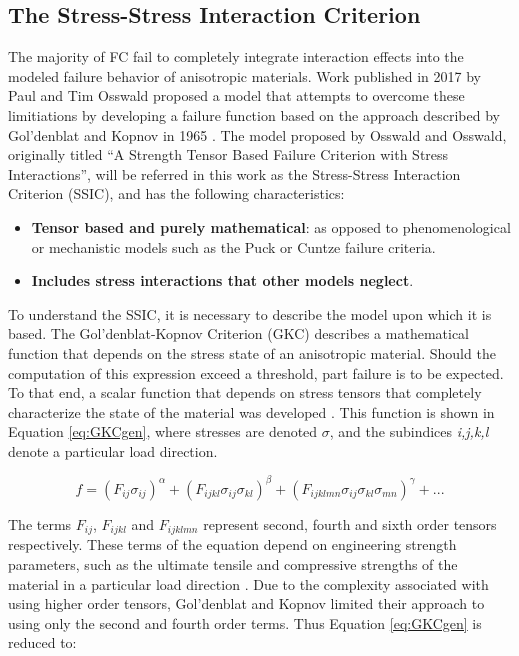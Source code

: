 \documentclass[main.tex]{subfiles}
\begin{document}
\subsection{The Stress-Stress Interaction Criterion}

The majority of FC fail to completely integrate interaction effects into the modeled failure behavior of anisotropic materials. Work published in 2017 by Paul and Tim Osswald \cite{Osswald2017a} proposed a model that attempts to overcome these limitiations by developing a failure function based on the approach described by Gol'denblat and Kopnov in 1965 \cite{Goldenblat1965}. The model proposed by Osswald and Osswald, originally titled \textquotedblleft A Strength Tensor Based Failure Criterion with Stress Interactions\textquotedblright, will be referred in this work as the Stress-Stress Interaction Criterion (SSIC), and has the following characteristics:

\begin{itemize}
	\item \textbf{Tensor based and purely mathematical}: as opposed to phenomenological or mechanistic models such as the Puck or Cuntze failure criteria.
	\item \textbf{Includes stress interactions that other models neglect}.
\end{itemize}

To understand the SSIC, it is necessary to describe the model upon which it is based. The Gol'denblat-Kopnov Criterion (GKC) describes a mathematical function that depends on the stress state of an anisotropic material. Should the computation of this expression exceed a threshold, part failure is to be expected. To that end, a scalar function that depends on stress tensors that completely characterize the state of the material was developed \cite{Goldenblat1965}. This function is shown in Equation \ref{eq:GKCgen}, where stresses are denoted $\sigma$, and the subindices \emph{i,j,k,l} denote a particular load direction.

\begin{equation} \label{eq:GKCgen}
f=(F_{ij}\sigma_{ij})^\alpha + (F_{ijkl}\sigma_{ij}\sigma_{kl})^\beta + (F_{ijklmn}\sigma_{ij}\sigma_{kl}\sigma_{mn})^\gamma + ...
\end{equation}

The terms $F_{ij}$, $F_{ijkl}$ and $F_{ijklmn}$ represent second, fourth and sixth order tensors respectively. These terms of the equation depend on engineering strength parameters, such as the ultimate tensile and compressive strengths of the material in a particular load direction \cite{Osswald2017a}. Due to the complexity associated with using higher order tensors, Gol'denblat and Kopnov limited their approach to using only the second and fourth order terms. Thus Equation \ref{eq:GKCgen} is reduced to:
\end{document}
